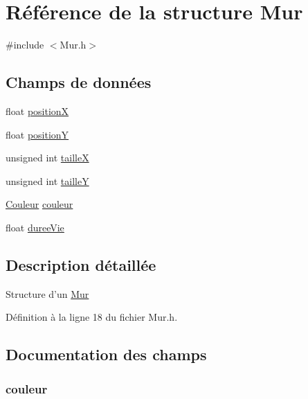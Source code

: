 \hypertarget{struct_mur}{\section{Référence de la structure Mur}
\label{struct_mur}
}


{\ttfamily \#include $<$Mur.\-h$>$}

\subsection*{Champs de données}
\begin{DoxyCompactItemize}
\item 
float \hyperlink{struct_mur_a79a982036e5591bf27af7cc2edcd6f4c}{position\-X}
\item 
float \hyperlink{struct_mur_ad17be35b83017d6dc83074e6b8d21207}{position\-Y}
\item 
unsigned int \hyperlink{struct_mur_a14a7f2008ff990cae95babeb28176bad}{taille\-X}
\item 
unsigned int \hyperlink{struct_mur_ab277c464cec35f230262c48fec89a566}{taille\-Y}
\item 
\hyperlink{_couleur_8h_aa304d0ca681f782b1d7735da33037dd7}{Couleur} \hyperlink{struct_mur_af0e152d09c13944935e00bef7a3c5111}{couleur}
\item 
float \hyperlink{struct_mur_a70238edfbee0de43d594921f108c7ad3}{duree\-Vie}
\end{DoxyCompactItemize}


\subsection{Description détaillée}
Structure d'un \hyperlink{struct_mur}{Mur} 

Définition à la ligne 18 du fichier Mur.\-h.



\subsection{Documentation des champs}
\hypertarget{struct_mur_af0e152d09c13944935e00bef7a3c5111}{
\subsubsection[{couleur}]{ couleur}}\label{struct_mur_af0e152d09c13944935e00bef7a3c5111}


